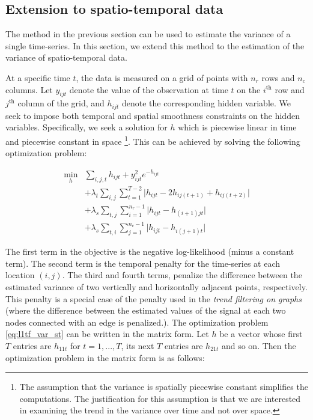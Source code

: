 \documentclass{article}
\begin{document}
\subsection{Extension to spatio-temporal data}
\label{sec:exten}

The method in the previous section can be used to estimate the variance of a single time-series. In this section, we extend this method to the estimation of the variance of spatio-temporal data.

At a specific time $t$, the data is measured on a grid of points with $n_r$ rows and $n_c$ columns. Let $y_{ijt}$ denote the value of the observation at time $t$ on the $i^\text{th}$ row and $j^\text{th}$ column of the grid, and $h_{ijt}$ denote the corresponding hidden variable. We seek to impose both temporal and spatial smoothness constraints on the hidden variables. Specifically, we seek a solution for $h$ which is piecewise linear in time and piecewise constant in space \footnote{The assumption that the variance is spatially piecewise constant simplifies the computations. The justification for this assumption is that we are interested in examining the trend in the variance over time and not over space.}. This can be achieved by solving the following optimization problem:

\begin{equation}
\begin{aligned}
\min_h &\sum_{i,j,t}h_{ijt}+y_{ijt}^2e^{-h_{ijt}}\\
&+\lambda_t \sum_{i,j} \sum_{t=1}^{T-2} \big|h_{ijt}-2h_{ij(t+1)}+h_{ij(t+2)}\big|\\
&+\lambda_s \sum_{t,j} \sum_{i=1}^{n_r-1} \big|h_{ijt}-h_{(i+1)jt}\big|\\
&+\lambda_s \sum_{t,i} \sum_{j=1}^{n_c-1} \big|h_{ijt}-h_{i(j+1)t}\big|
\end{aligned}
\label{eq:l1tf_var_st}
\end{equation}

The first term in the objective is the negative log-likelihood (minus a constant term). The second term is the temporal penalty for the time-series at each location $(i,j)$. The third and fourth terms, penalize the difference between the estimated variance of two vertically and horizontally adjacent points, respectively. This penalty is a special case of the penalty used in the \textit{trend filtering on graphs }\citep{wang_trend_2016} (where the difference between the estimated values of the signal at each two nodes connected with an edge is penalized.). The optimization problem \eqref{eq:l1tf_var_st} can be written in the matrix form. Let $h$ be a vector whose first $T$ entries are $h_{11t}$ for $t=1,...,T$, its next $T$ entries are $h_{21t}$ and so on. Then the optimization problem in the matrix form is as follows:
\end{document}
